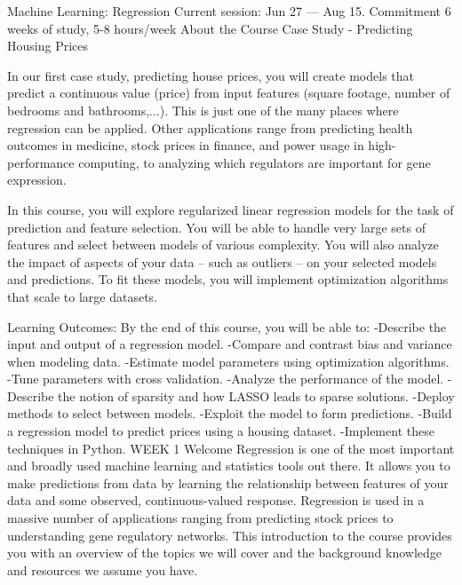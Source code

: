 Machine Learning: Regression
Current session: Jun 27 — Aug 15.
Commitment
6 weeks of study, 5-8 hours/week
About the Course
Case Study - Predicting Housing Prices

In our first case study, predicting house prices, you will create models that predict a continuous value (price) from input features (square footage, number of bedrooms and bathrooms,...).  This is just one of the many places where regression can be applied.  Other applications range from predicting health outcomes in medicine, stock prices in finance, and power usage in high-performance computing, to analyzing which regulators are important for gene expression.

In this course, you will explore regularized linear regression models for the task of prediction and feature selection.  You will be able to handle very large sets of features and select between models of various complexity.  You will also analyze the impact of aspects of your data -- such as outliers -- on your selected models and predictions.  To fit these models, you will implement optimization algorithms that scale to large datasets.

Learning Outcomes:  By the end of this course, you will be able to:
   -Describe the input and output of a regression model.
   -Compare and contrast bias and variance when modeling data.
   -Estimate model parameters using optimization algorithms.
   -Tune parameters with cross validation.
   -Analyze the performance of the model.
   -Describe the notion of sparsity and how LASSO leads to sparse solutions.
   -Deploy methods to select between models.
   -Exploit the model to form predictions. 
   -Build a regression model to predict prices using a housing dataset.
   -Implement these techniques in Python.
WEEK 1
Welcome
Regression is one of the most important and broadly used machine learning and statistics tools out there. It allows you to make predictions from data by learning the relationship between features of your data and some observed, continuous-valued response. Regression is used in a massive number of applications ranging from predicting stock prices to understanding gene regulatory networks.
This introduction to the course provides you with an overview of the topics we will cover and the background knowledge and resources we assume you have.

